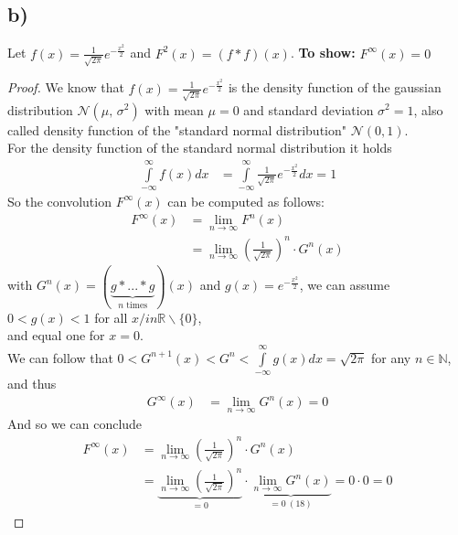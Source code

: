\documentclass[a4paper]{article}
\begin{document}
    \subsection*{b)}
        Let $f(x) = \frac{1}{\sqrt{2 \pi}} e^{-\frac{x^2}{2}}$ and $F^2(x) = (f \ast f)(x)$.
        \textbf{To show:} $F^{\infty}(x) = 0$
        \begin{proof}
            We know that $f(x) = \frac{1}{\sqrt{2 \pi}} e^{-\frac{x^2}{2}}$ is the density function of the gaussian distribution 
            $\mathcal{N}(\mu,\,\sigma^{2})$ with mean $\mu = 0$ and standard deviation $\sigma^2 =1$, 
            also called density function of the "standard normal distribution" $\mathcal{N}(0,1)$.\\
            For the density function of the standard normal distribution it holds
            \begin{align}
                \int\limits_{-\infty}^{\infty} f(x) dx 
                &= \int\limits_{-\infty}^{\infty} \frac{1}{\sqrt{2 \pi}} e^{-\frac{x^2}{2}} dx = 1
            \end{align}
            So the convolution $F^{\infty}(x)$ can be computed as follows:
            \begin{align}
                F^{\infty}(x) &= \lim_{n \rightarrow \infty} F^n(x)\\
                &= \lim_{n \rightarrow \infty} \left( \frac{1}{\sqrt{2 \pi}} \right)^n \cdot G^n(x)
            \end{align}
            with $G^n(x) = (\underbrace{g \ast ... \ast g}_{n\text{ times}})(x)$ and $g(x) = e^{-\frac{x^2}{2}}$, we can assume
            $0 < g(x) < 1$ for all $x /in \mathbb{R}\backslash\{0\}$,\\ and equal one for $x=0$.\\
            We can follow that $0 < G^{n+1}(x) < G^{n} < \int\limits_{-\infty}^{\infty} g(x) dx = \sqrt{2\pi}$ for any $n \in \mathbb{N}$, and thus
            \begin{align}
                G^{\infty}(x) &= \lim_{n \rightarrow \infty} G^n(x) = 0
            \end{align}
            And so we can conclude
            \begin{align}
                F^{\infty}(x) &= \lim_{n \rightarrow \infty} \left( \frac{1}{\sqrt{2 \pi}} \right)^n \cdot G^n(x)\\
                &= \underbrace{\lim_{n \rightarrow \infty} \left( \frac{1}{\sqrt{2 \pi}} \right)^n}_{=0} \cdot \underbrace{\lim_{n \rightarrow \infty} G^n(x)}_{=0\ (18)}
                = 0 \cdot 0 = 0
            \end{align}
            
        \end{proof}
\end{document}
